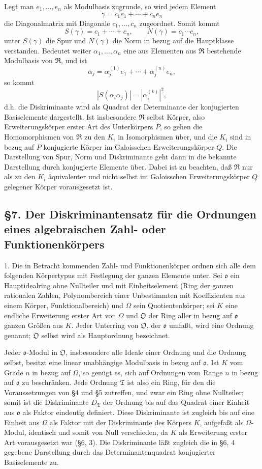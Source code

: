 \documentclass[11pt]{article}
\providecommand{\mR}{\mathfrak{R}}
\providecommand{\mT}{\mathfrak{T}}
\providecommand{\mO}{\mathfrak{O}}
\providecommand{\mo}{\mathfrak{o}}
\begin{document}
Legt man $e_1,\ldots,e_n$ als Modulbasis zugrunde, so wird jedem Element
\[
        \gamma=c_1e_1+\cdots+c_ne_n
\]
die Diagonalmatrix mit Diagonale $c_1,\ldots,c_n$ zugeordnet. Somit kommt
\[
        S(\gamma)=c_1+\cdots+c_n,
        \qquad
        N(\gamma)=c_1\cdots c_n,
\]
unter $S(\gamma)$ die Spur und $N(\gamma)$ die Norm in bezug auf die Hauptklasse verstanden. Bedeutet weiter $\alpha_1,\ldots,\alpha_n$ eine aus Elementen aus $\mR$ bestehende Modulbasis von $\mR$, und ist
\[
        \alpha_j=\alpha_j^{(1)}e_1+\cdots+\alpha_j^{(n)}e_n,
\]
so kommt
\[
        |S(\alpha_i\alpha_j)|=
        \left|\alpha_i^{(k)}\right|^2,
\]
d.h. die Diskriminante wird als Quadrat der Determinante der konjugierten Basiselemente dargestellt. Ist insbesondere $\mR$ selbst Körper, also Erweiterungskörper erster Art des Unterkörpers $P$, so gehen die Homomorphismen von $\mR$ zu den $K_i$ in Isomorphismen über, und die $K_i$ sind in bezug auf $P$ konjugierte Körper im Galoisschen Erweiterungskörper $Q$. Die Darstellung von Spur, Norm und Diskriminante geht dann in die bekannte Darstellung durch konjugierte Elemente über. Dabei ist zu beachten, daß $\mR$ nur als zu den $K_i$ äquivalenter und nicht selbst im Galoisschen Erweiterungskörper $Q$ gelegener Körper vorausgesetzt ist.

\subsection*{§7. Der Diskriminantensatz für die Ordnungen eines algebraischen Zahl- oder Funktionenkörpers}

1. Die in Betracht kommenden Zahl- und Funktionenkörper ordnen sich alle dem folgenden Körpertypus mit Festlegung der ganzen Elemente unter. Sei $\mo$ ein Hauptidealring ohne Nullteiler und mit Einheitselement (Ring der ganzen rationalen Zahlen, Polynombereich einer Unbestimmten mit Koeffizienten aus einem Körper, Funktionalbereich) und $\Omega$ sein Quotientenkörper; sei $K$ eine endliche Erweiterung erster Art von $\Omega$ und $\mO$ der Ring aller in bezug auf $\mo$ ganzen Größen aus $K$. Jeder Unterring von $\mO$, der $\mo$ umfaßt, wird eine Ordnung genannt; $\mO$ selbst wird als Hauptordnung bezeichnet.

Jeder $\mo$-Modul in $\mO$, insbesondere alle Ideale einer Ordnung und die Ordnung selbst, besitzt eine linear unabhängige Modulbasis in bezug auf $\mo$. Ist $K$ vom Grade $n$ in bezug auf $\Omega$, so genügt es, sich auf Ordnungen vom Range $n$ in bezug auf $\mo$ zu beschränken. Jede Ordnung $\mT$ ist also ein Ring, für den die Voraussetzungen von §4 und §5 zutreffen, und zwar ein Ring ohne Nullteiler; somit ist die Diskriminante $D_\mT$ der Ordnung bis auf das Quadrat einer Einheit aus $\mo$ als Faktor eindeutig definiert. Diese Diskriminante ist zugleich bis auf eine Einheit aus $\Omega$ als Faktor mit der Diskriminante des Körpers $K$, aufgefaßt als $\Omega$-Modul, identisch und somit von Null verschieden, da $K$ als Erweiterung erster Art vorausgesetzt war (§6, 3). Die Diskriminante läßt zugleich die in §6, 4 gegebene Darstellung durch das Determinantenquadrat konjugierter Basiselemente zu.
\end{document}
